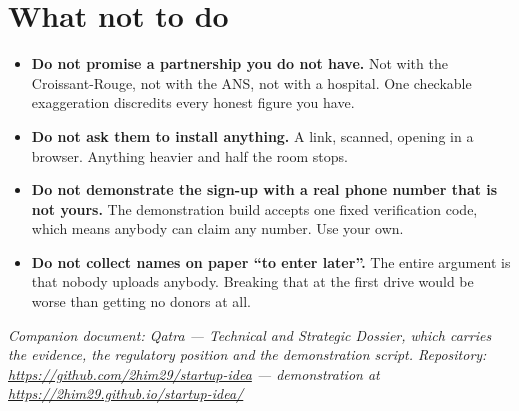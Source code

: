 \documentclass[11pt,a4paper]{article}
\newcommand{\note}[1]{{\small\color{qatraGrey}\textit{#1}}}
\begin{document}
\section{What not to do}

\begin{itemize}[leftmargin=1.4em]
  \item \textbf{Do not promise a partnership you do not have.} Not with the
        Croissant-Rouge, not with the ANS, not with a hospital. One checkable
        exaggeration discredits every honest figure you have.
  \item \textbf{Do not ask them to install anything.} A link, scanned, opening
        in a browser. Anything heavier and half the room stops.
  \item \textbf{Do not demonstrate the sign-up with a real phone number that is
        not yours.} The demonstration build accepts one fixed verification
        code, which means anybody can claim any number. Use your own.
  \item \textbf{Do not collect names on paper ``to enter later''.} The entire
        argument is that nobody uploads anybody. Breaking that at the first
        drive would be worse than getting no donors at all.
\end{itemize}

\vfill
\note{Companion document: \emph{Qatra --- Technical and Strategic Dossier},
which carries the evidence, the regulatory position and the demonstration
script. Repository: \url{https://github.com/2him29/startup-idea} ---
demonstration at \url{https://2him29.github.io/startup-idea/}}
\end{document}
